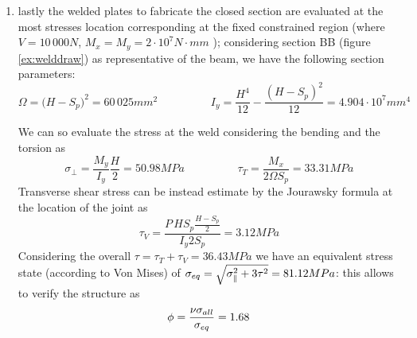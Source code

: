 \begin{enumerate}
	\item lastly the welded plates to fabricate the closed section are evaluated at the most stresses location corresponding at the fixed constrained region (where $V = 10\,000N$, $M_{x} = M_y = 2\cdot 10^7N\cdot mm$ ); considering section BB (figure \ref{ex:welddraw}) as representative of the beam, we have the following section parameters:
	\[ \Omega = \big(H-S_p\big)^2 = 60\,025 mm^2 \hspace{2cm} I_y = \frac{H^4}{12} - \frac{(H-S_p)^2}{12} = 4.904 \cdot 10^7 mm^4 \]
	
	We can so evaluate the stress at the weld considering the bending and the torsion as
	\[ \sigma_\perp = \frac{M_y}{I_y} \frac H 2 = 50.98 MPa \hspace{2cm} \tau_T = \frac{M_x}{2\Omega S_p} = 33.31 MPa \]
	Transverse shear stress can be instead estimate by the Jourawsky formula at the location of the joint as
	\[ \tau_V = \frac{P \, H S_p \frac{H-S_p}{2}}{I_y 2 S_p} = 3.12 MPa \]
	Considering the overall $\tau = \tau_T+\tau_V = 36.43MPa$ we have an equivalent stress state (according to Von Mises) of $\sigma_{eq} = \sqrt{\sigma_\parallel^2 + 3\tau^2} = 81.12 MPa$: this allows to verify the structure as
	\[ \phi = \frac{\nu \sigma_{all}}{\sigma_{eq}} = 1.68 \]
	
	
	
	
	
\end{enumerate}
	
	
	
	
	
	
	
	
	
	
	
	
	
	
	
	
	
	
	
	
	
	
	
	
	
	
	
	
	
	
	
	
	